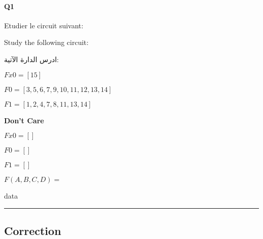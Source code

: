

\pagebreak

\paragraph{Q1}



Etudier le circuit suivant:



Study the following circuit:

\begin{arab}[utf]
ادرس الدارة الآتية:
\end{arab}

 

$Fx0 = [15]$



$F0 = [3, 5, 6, 7, 9, 10, 11, 12, 13, 14]$



$F1 = [1, 2, 4, 7, 8, 11, 13, 14]$



\textbf{Don't Care }
 
$Fx0 = []$

$F0 = []$

$F1 = []$



$F(A,B,C,D) =$



 


data


\hrule width 1\linewidth
\pagebreak

\subsection{Correction}


